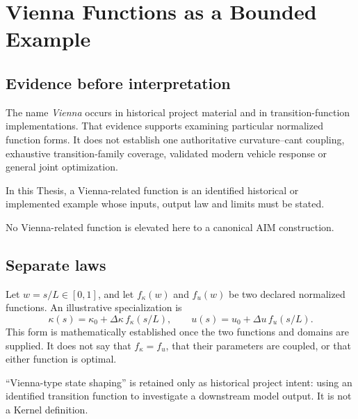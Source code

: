 \chapter{Vienna Functions as a Bounded Example}
\label{chap:vienna-reinterpretation}

\section*{Evidence before interpretation}

The name \emph{Vienna} occurs in historical project material and in
transition-function implementations. That evidence supports examining
particular normalized function forms. It does not establish one authoritative
curvature--cant coupling, exhaustive transition-family coverage, validated
modern vehicle response or general joint optimization.

\begin{principle}
\label{princ:vienna-reinterpretation}
In this Thesis, a Vienna-related function is an identified historical or
implemented example whose inputs, output law and limits must be stated.
\end{principle}

\begin{principle}
\label{princ:vienna-no-special-curve}
No Vienna-related function is elevated here to a canonical AIM construction.
\end{principle}

\section{Separate laws}

Let \(w=s/L\in[0,1]\), and let \(f_\kappa(w)\) and \(f_u(w)\) be two declared
normalized functions. An illustrative specialization is
\[
\kappa(s)=\kappa_0+\Delta\kappa\,f_\kappa(s/L),
\qquad
u(s)=u_0+\Delta u\,f_u(s/L).
\]
This form is mathematically established once the two functions and domains
are supplied. It does not say that \(f_\kappa=f_u\), that their parameters
are coupled, or that either function is optimal.

\begin{definition}
\label{def:vienna-state-shaping}
``Vienna-type state shaping'' is retained only as historical project intent:
using an identified transition function to investigate a downstream
model output. It is not a Kernel definition.
\end{definition}

